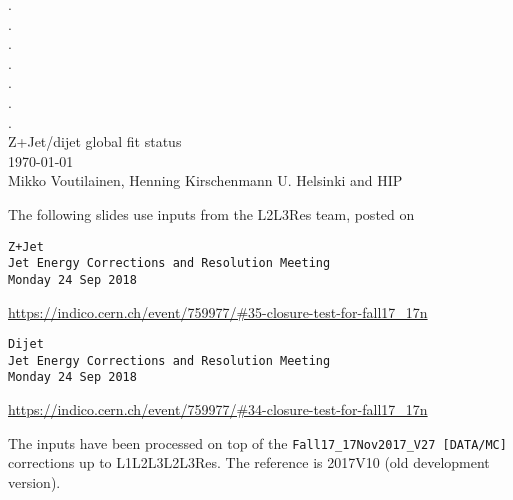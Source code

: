 \documentclass[landscape,10pt]{beamer} %
\begin{document}
\begin{centering}
{. }\\
{. }\\
{. }\\
{. }\\
{. }\\
{. }\\
{. }\\
Z+Jet/dijet global fit status\\
\today\\
Mikko Voutilainen, Henning Kirschenmann
U. Helsinki and HIP\\
\end{centering}
\newpage

The following slides use inputs from the L2L3Res team, posted on 
%
%


\begin{verbatim}
Z+Jet
Jet Energy Corrections and Resolution Meeting
Monday 24 Sep 2018
\end{verbatim}
\url{https://indico.cern.ch/event/759977/#35-closure-test-for-fall17_17n}


\begin{verbatim}
Dijet
Jet Energy Corrections and Resolution Meeting
Monday 24 Sep 2018
\end{verbatim}
\url{https://indico.cern.ch/event/759977/#34-closure-test-for-fall17_17n}

The inputs have been processed on top of the \verb|Fall17_17Nov2017_V27 [DATA/MC]| corrections up to L1L2L3L2L3Res. The reference is 2017V10 (old development version). \\
\end{document}
